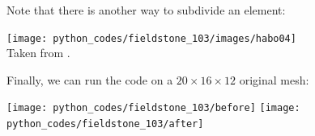 Note that there is another way to subdivide an element:
\begin{center}
\texttt{[image: python\_codes/fieldstone\_103/images/habo04]}\\
{\captionfont Taken from \cite{habo04}.}
\end{center}

Finally, we can run the code on a $20\times16\times12$ original mesh:
\begin{center}
\texttt{[image: python\_codes/fieldstone\_103/before]}
\texttt{[image: python\_codes/fieldstone\_103/after]}
\end{center}

